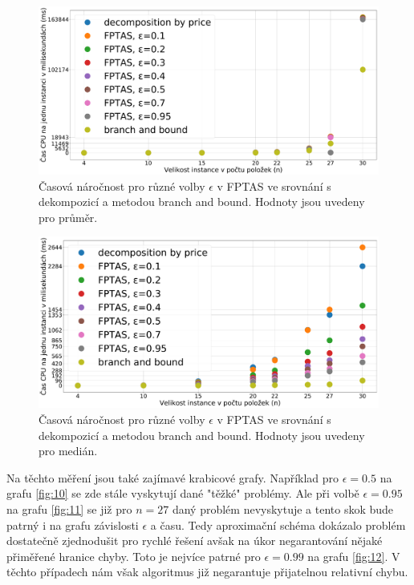 \documentclass[11pt]{article}
\begin{document}
 \begin{figure}[h]\centering
	\includegraphics[scale=0.2]{img/FPTASavg}
 	\caption[2]{Časová náročnost pro různé volby $\epsilon$ v FPTAS ve srovnání s dekompozicí a metodou branch and bound. Hodnoty jsou uvedeny pro průměr.}\label{fig:8}
 \end{figure} 	
 \begin{figure}[h]\centering
	\includegraphics[scale=0.2]{img/FPTAS50}
 	\caption[2]{Časová náročnost pro různé volby $\epsilon$ v FPTAS ve srovnání s dekompozicí a metodou branch and bound. Hodnoty jsou uvedeny pro medián.}\label{fig:9}
 \end{figure} 	
 
Na těchto měření jsou také zajímavé krabicové grafy. Například pro $\epsilon=0.5$ na grafu \ref{fig:10} se zde stále vyskytují dané "těžké" problémy. Ale při volbě $\epsilon=0.95$ na grafu \ref{fig:11} se již pro $n=27$ daný problém nevyskytuje a tento skok bude patrný i na grafu závislosti $\epsilon$ a času. Tedy aproximační schéma dokázalo problém dostatečně zjednodušit pro rychlé řešení avšak na úkor negarantování nějaké přiměřené hranice chyby. Toto je nejvíce patrné pro $\epsilon=0.99$ na grafu \ref{fig:12}. V těchto případech nám však algoritmus již negarantuje přijatelnou relativní chybu.
 
\end{document}
